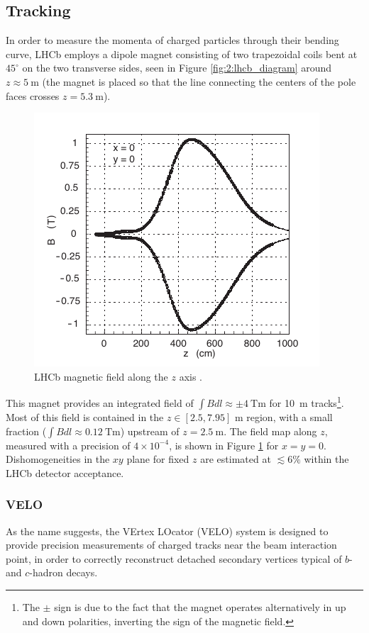 \subsection{Tracking}
\label{sec:2:tracking}
In order to measure the momenta of charged particles through their bending curve, LHCb employs a dipole magnet \cite{Amato:424338} consisting of two trapezoidal coils bent at $45^\circ$ on the two transverse sides, seen in Figure \ref{fig:2:lhcb_diagram} around $z\approx \SI{5}{\meter}$ (the magnet is placed so that the line connecting the centers of the pole faces crosses $z=\SI{5.3}{\meter}$).

\begin{figure}[t]
	\centering
	\includegraphics[width=.6\textwidth]{graphics/02-lhcb/b_field_map_z.png}
	\caption[LHCb magnetic field along the $z$ axis.]{LHCb magnetic field along the $z$ axis \cite{Amato:424338}.}
	\label{fig:2:b_field_map_z}
\end{figure}

This magnet provides an integrated field of $\int B dl \approx \pm \SI{4}{\tesla\meter}$ for \SI{10}{\meter} tracks\footnote{The $\pm$ sign is due to the fact that the magnet operates alternatively in up and down polarities, inverting the sign of the magnetic field.}.
Most of this field is contained in the $z\in[2.5,7.95]$ \si{\meter} region, with 
a small fraction ($\int B dl \approx \SI{0.12}{\tesla\meter}$) upstream of $z=\SI{2.5}{\meter}$. The field map along $z$, measured with a precision of $4 \times {10}^{-4}$, is shown in Figure \ref{fig:2:b_field_map_z} for $x=y=0$.
Dishomogeneities in the $xy$ plane for fixed $z$ are estimated at $\lesssim 6\%$ within the LHCb detector acceptance.

\subsubsection{VELO}
As the name suggests, the VErtex LOcator (VELO) system \cite{Barbosa-Marinho:504321} is designed to provide precision measurements of charged tracks near the beam interaction point, in order to correctly reconstruct detached secondary vertices typical of $b$- and $c$-hadron decays.

